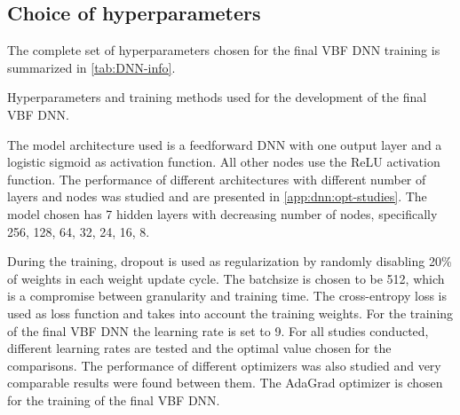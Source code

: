 \subsection{Choice of hyperparameters}
\label{subsec:hyper-parameters}
The complete set of hyperparameters chosen for the final VBF DNN training is summarized in \cref{tab:DNN-info}. 
\begin{table}[t]
    \begin{center}
        
    \end{center}
    \caption{Hyperparameters and training methods used for the development of the final VBF DNN.
    }
    \label{tab:DNN-info}
\end{table}
The model architecture used is a feedforward DNN with one output layer and a logistic sigmoid as activation function. All other nodes use the ReLU activation function.
The performance of different architectures with different number of layers and nodes was studied and are presented in \cref{app:dnn:opt-studies}.
The model chosen has 7 hidden layers with decreasing number of nodes, specifically {256, 128, 64, 32, 24, 16, 8}.

During the training, dropout is used as regularization by randomly disabling 20\% of weights in each weight update cycle.
The batchsize is chosen to be 512, which is a compromise between granularity and training time.
The cross-entropy loss is used as loss function and takes into account the training weights.
For the training of the final VBF DNN the learning rate is set to 9. For all studies conducted, different learning rates are tested and the optimal value chosen for the comparisons. 
The performance of different optimizers was also studied and very comparable results were found between them.
The AdaGrad optimizer is chosen for the training of the final VBF DNN.

